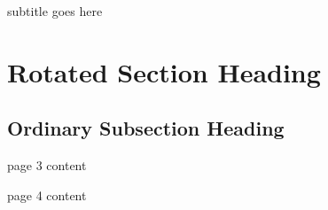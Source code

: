 \documentclass[12pt,foldmark]{leaflet}
\begin{document}
{subtitle goes here}

\withrotationtrue
\section{Rotated Section Heading}
\withrotationfalse
\subsection{Ordinary Subsection Heading}
\newpage

page 3 content
\newpage

page 4 content
\newpage




\end{document}
